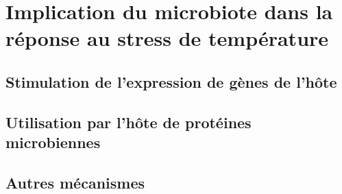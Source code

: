 \chapter{Implication du microbiote dans la réponse au stress de température} %
	\label{sec:implicationµbiote}
		

	\section{Stimulation de l'expression de gènes de l'hôte} %
		\label{sec:gènes_hôte}
			

	\section{Utilisation par l'hôte de protéines microbiennes} %
	 	\label{sec:gènes_microbiens}
	 		

	\section{Autres mécanismes} %
		\label{sec:autres_m_canismes}
			



	


